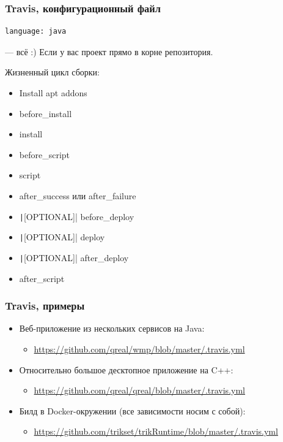 \documentclass[xetex,mathserif,serif]{beamer}
\begin{document}
	\begin{frame}[fragile]
		\frametitle{Travis, конфигурационный файл}
		\begin{verbatim}
language: java
		\end{verbatim}
		--- всё :) Если у вас проект прямо в корне репозитория.

		Жизненный цикл сборки:
		\begin{footnotesize}
			\begin{itemize}
				\item Install apt addons
				\item before\_install
				\item install
				\item before\_script
				\item script
				\item after\_success или after\_failure
				\item \texttt|[OPTIONAL]| before\_deploy
				\item \texttt|[OPTIONAL]| deploy
				\item \texttt|[OPTIONAL]| after\_deploy
				\item after\_script
			\end{itemize}
		\end{footnotesize}
	\end{frame}

	\begin{frame}
		\frametitle{Travis, примеры}
		\begin{itemize}
			\item Веб-приложение из нескольких сервисов на Java:
			\begin{itemize}
				\item \url{https://github.com/qreal/wmp/blob/master/.travis.yml}
			\end{itemize}
			\item Относительно большое десктопное приложение на C++:
			\begin{itemize}
				\item \url{https://github.com/qreal/qreal/blob/master/.travis.yml}
			\end{itemize}
			\item Билд в Docker-окружении (все зависимости носим с собой):
			\begin{itemize}
				\item \url{https://github.com/trikset/trikRuntime/blob/master/.travis.yml}
			\end{itemize}
		\end{itemize}
	\end{frame}
\end{document}
